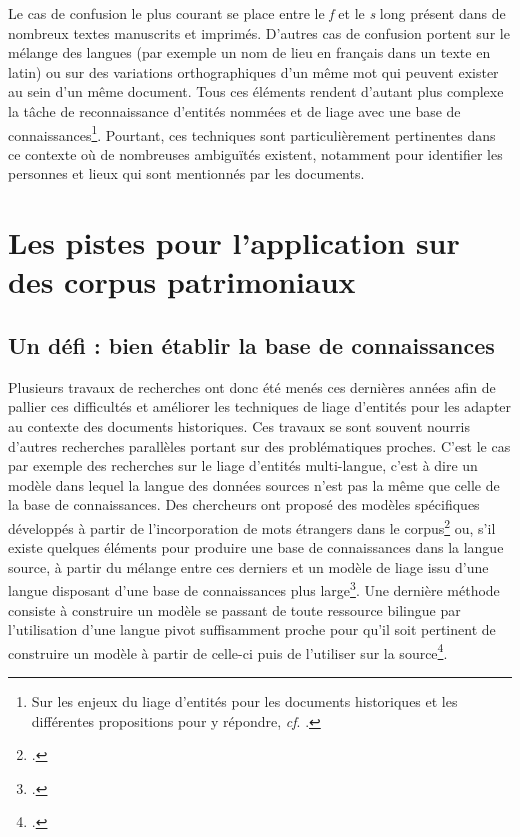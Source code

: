 \documentclass[a4paper,12pt,twoside]{book}
\begin{document}
	Le cas de confusion le plus courant se place entre le \textit{f} et le \textit{s} long présent dans de nombreux textes manuscrits et imprimés. D'autres cas de confusion portent sur le mélange des langues (par exemple un nom de lieu en français dans un texte en latin) ou sur des variations orthographiques d'un même mot qui peuvent exister au sein d'un même document. Tous ces éléments rendent d'autant plus complexe la tâche de reconnaissance d'entités nommées et de liage avec une base de connaissances\footnote{Sur les enjeux du liage d'entités pour les documents historiques et les différentes propositions pour y répondre, \textit{cf}. \cite{linhares_pontes_entity_2020}.}. Pourtant, ces techniques sont particulièrement pertinentes dans ce contexte où de nombreuses ambiguïtés existent, notamment pour identifier les personnes et lieux qui sont mentionnés par les documents.
	
	\section{Les pistes pour l'application sur des corpus patrimoniaux}
	
	\subsection{Un défi : bien établir la base de connaissances}
	
	Plusieurs travaux de recherches ont donc été menés ces dernières années afin de pallier ces difficultés et améliorer les techniques de liage d'entités pour les adapter au contexte des documents historiques. Ces travaux se sont souvent nourris d'autres recherches parallèles portant sur des problématiques proches. C'est le cas par exemple des recherches sur le liage d'entités multi-langue, c'est à dire un modèle dans lequel la langue des données sources n'est pas la même que celle de la base de connaissances. Des chercheurs ont proposé des modèles spécifiques développés à partir de l'incorporation de mots étrangers dans le corpus\footcite{linhares_pontes_linking_2020} ou, s'il existe quelques éléments pour produire une base de connaissances dans la langue source, à partir du mélange entre ces derniers et un modèle de liage issu d'une langue disposant d'une base de connaissances plus large\footcite{zhou_towards_2019}. Une dernière méthode consiste à construire un modèle se passant de toute ressource bilingue par l'utilisation d'une langue pivot suffisamment proche pour qu'il soit pertinent de construire un modèle à partir de celle-ci puis de l'utiliser sur la source\footcite{rijhwani_zero-shot_2019}.
	
\end{document}
